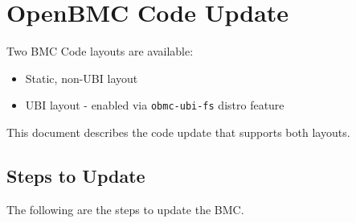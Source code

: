 \hypertarget{openbmc-code-update}{%
\section{OpenBMC Code Update}\label{openbmc-code-update}}

Two BMC Code layouts are available:

\begin{itemize}
\tightlist
\item
  Static, non-UBI layout
\item
  UBI layout - enabled via \texttt{obmc-ubi-fs} distro feature
\end{itemize}

This document describes the code update that supports both layouts.

\hypertarget{steps-to-update}{%
\subsection{Steps to Update}\label{steps-to-update}}

The following are the steps to update the BMC.

